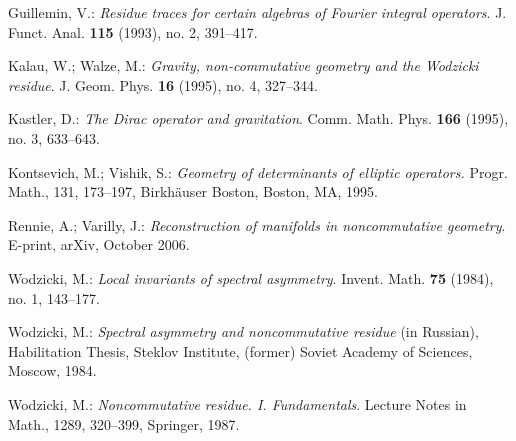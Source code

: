 \documentclass[leqno, 10pt]{amsart}
\theoremstyle{remark}
\begin{document}
\begin{thebibliography}{CCM}
  Guillemin, V.: 
  \emph{Residue traces for certain algebras of Fourier integral operators}. 
  J. Funct. Anal. \textbf{115} (1993), no. 2, 391--417. 
  
  Kalau, W.; Walze, M.: \emph{Gravity, non-commutative geometry and the Wodzicki residue}. 
 J. Geom. Phys. \textbf{16} (1995), no. 4, 327--344. 

  Kastler, D.: \emph{The Dirac operator and gravitation}. 
 Comm. Math. Phys. \textbf{166} (1995), no. 3, 633--643. 

    Kontsevich, M.; Vishik, S.:    \emph{Geometry of determinants of elliptic operators.} 
   Progr. Math., 131,  173--197,  Birkh\"auser Boston, Boston, MA, 1995. 
 
 Rennie, A.; Varilly, J.: \emph{Reconstruction of manifolds in noncommutative geometry}. E-print, arXiv, October 2006.
 
  Wodzicki, M.: \emph{Local invariants of spectral asymmetry}. 
Invent. Math. \textbf{75} (1984), no. 1, 143--177. 

    Wodzicki, M.: \emph{Spectral asymmetry and noncommutative residue} (in Russian), 
   Habilitation Thesis, Steklov Institute, (former) Soviet Academy of Sciences, Moscow, 1984.

  Wodzicki, M.: \emph{Noncommutative residue. I. Fundamentals}. 
 Lecture Notes in Math., 1289, 320--399, Springer, 1987. 
\end{thebibliography}
\end{document}
